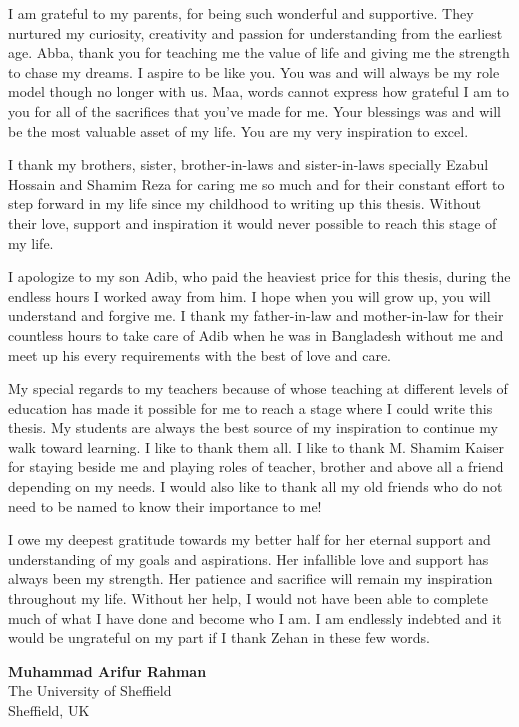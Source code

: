 \begin{acknowledgements}
I am grateful to my parents, for being such wonderful and supportive. They nurtured my curiosity, creativity and passion for understanding from the earliest age. Abba, thank you for teaching me the value of life and giving me the strength to chase my dreams. I aspire to be like you. You was and will always be my role model though no longer with us. Maa, words cannot express how grateful I am to you for all of the sacrifices that you’ve made for me. Your blessings was and will be the most valuable asset of my life. You are my very inspiration to excel.  

I thank my brothers, sister, brother-in-laws and sister-in-laws specially Ezabul Hossain and Shamim Reza for caring me so much and for their constant effort to step forward in my life since my childhood to writing up this thesis. Without their love, support and inspiration it would never possible to reach this stage of my life. 

I apologize to my son Adib, who paid the heaviest price for this thesis, during the endless hours I worked away from him. I hope when you will grow up, you will understand and forgive me. I thank my father-in-law and mother-in-law for their countless hours to take care of Adib when he was in Bangladesh without me and meet up his every requirements with the best of love and care. 

My special regards to my teachers because of whose teaching at different levels of education has made it possible for me to reach a stage where I could write this thesis. My students are always the best source of my inspiration to continue my walk toward learning. I like to thank them all. I like to thank M. Shamim Kaiser for staying beside me and playing roles of teacher, brother and above all a friend depending on my needs. I would also like to thank all my old friends who do not need to be named to know their importance to me!

I owe my deepest gratitude towards my better half for her eternal support and understanding of my goals and aspirations. Her infallible love and support has always been my strength. Her patience and sacrifice will remain my inspiration throughout my life. Without her help, I would not have been able to complete much of what I have done and become who I am. I am endlessly indebted and it would be ungrateful on my part if I thank Zehan in these few words. \\


{\raggedleft
\textbf{Muhammad Arifur Rahman}\\
The University of Sheffield\\
Sheffield, UK\\
\date{\today}
}


\end{acknowledgements}
